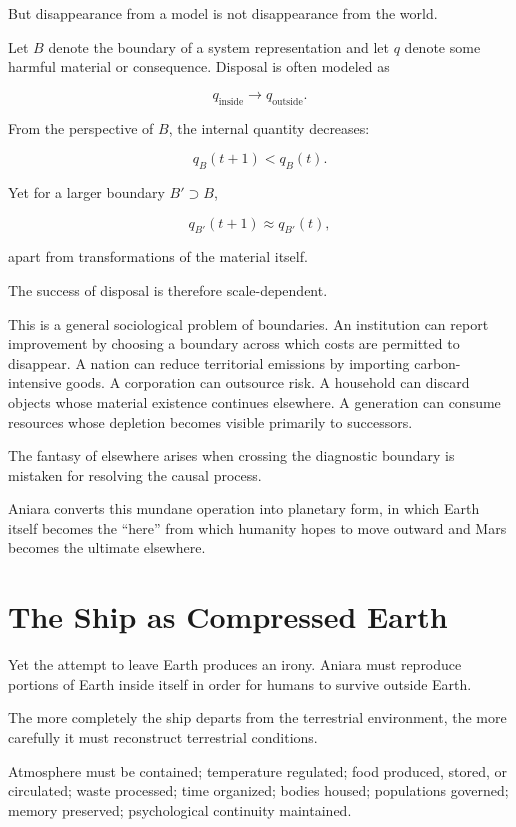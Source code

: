 \documentclass[11pt,oneside]{book}
\theoremstyle{definition}
\theoremstyle{remark}
\begin{document}
But disappearance from a model is not disappearance from the world.

Let \(B\) denote the boundary of a system representation and let \(q\) denote some harmful material or consequence. Disposal is often modeled as

\[
q_{\mathrm{inside}}
\rightarrow
q_{\mathrm{outside}}.
\]

From the perspective of \(B\), the internal quantity decreases:

\[
q_B(t+1)<q_B(t).
\]

Yet for a larger boundary \(B'\supset B\),

\[
q_{B'}(t+1)
\approx
q_{B'}(t),
\]

apart from transformations of the material itself.

The success of disposal is therefore scale-dependent.

This is a general sociological problem of boundaries. An institution can report improvement by choosing a boundary across which costs are permitted to disappear. A nation can reduce territorial emissions by importing carbon-intensive goods. A corporation can outsource risk. A household can discard objects whose material existence continues elsewhere. A generation can consume resources whose depletion becomes visible primarily to successors.

The fantasy of elsewhere arises when crossing the diagnostic boundary is mistaken for resolving the causal process.

Aniara converts this mundane operation into planetary form, in which Earth itself becomes the ``here'' from which humanity hopes to move outward and Mars becomes the ultimate elsewhere.

\section{The Ship as Compressed Earth}

Yet the attempt to leave Earth produces an irony. Aniara must reproduce portions of Earth inside itself in order for humans to survive outside Earth.

The more completely the ship departs from the terrestrial environment, the more carefully it must reconstruct terrestrial conditions.

Atmosphere must be contained; temperature regulated; food produced, stored, or circulated; waste processed; time organized; bodies housed; populations governed; memory preserved; psychological continuity maintained.
\end{document}
